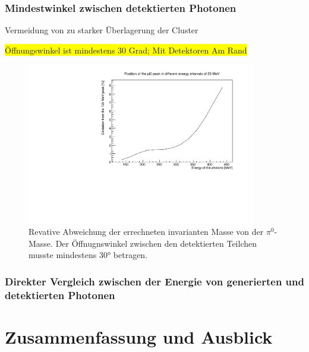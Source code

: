 \documentclass[a4paper,11pt,oneside,final,german,openbib,pdftex]{scrbook}
\begin{document}
{%

\subsection{Mindestwinkel zwischen detektierten Photonen}
Vermeidung von zu starker Überlagerung der Cluster

\colorbox{yellow}{\"Offnungswinkel ist mindestens 30 Grad; Mit Detektoren Am Rand}

\begin{figure}[h!]
	\begin{center}
		\includegraphics[width=100mm]{20171804MinOpeningAngleDeviation}
		\caption{Revative Abweichung der errechneten invarianten Masse von der $\pi^0$-Masse. Der \"Offnugnswinkel zwischen den detektierten Teilchen musste mindestens 30° betragen.}
	\end{center}
\end{figure}


\subsection{Direkter Vergleich zwischen der Energie von generierten und detektierten Photonen}
\label{sec-Vergleich-Energie-gen-rec}

\chapter{Zusammenfassung und Ausblick}


}
\end{document}
